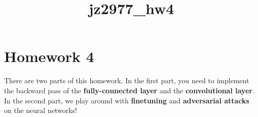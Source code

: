 \documentclass[11pt]{article}
\title{jz2977\_hw4}
\begin{document}
    
    
    \maketitle
    
    

    
    \section{Homework 4}\label{homework-4}

There are two parts of this homework. In the first part, you need to
implement the backward pass of the \textbf{fully-connected layer} and
the \textbf{convolutional layer}. In the second part, we play around
with \textbf{finetuning} and \textbf{adversarial attacks} on the neural
networks!
\end{document}
